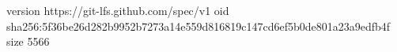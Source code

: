 version https://git-lfs.github.com/spec/v1
oid sha256:5f36be26d282b9952b7273a14e559d816819c147cd6ef5b0de801a23a9edfb4f
size 5566
